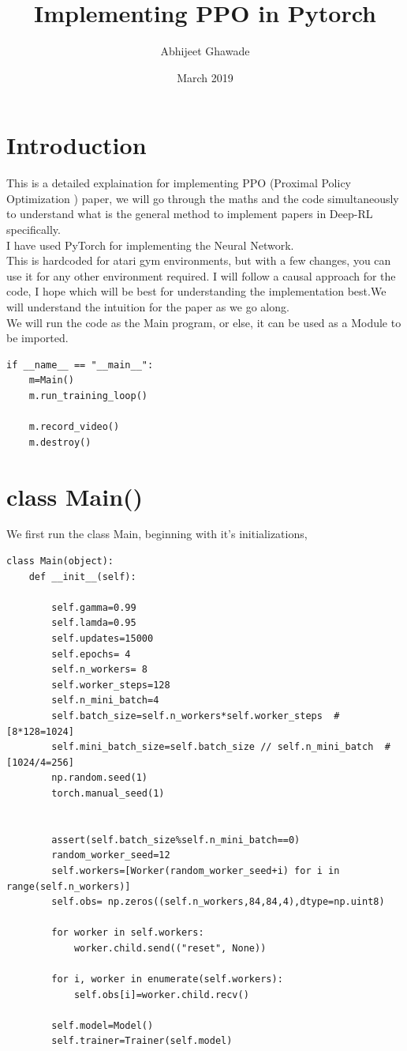 \documentclass[12pt]{extarticle}
\title{Implementing PPO in Pytorch}
\author{Abhijeet Ghawade}
\date{March 2019}
\begin{document}
\maketitle
\section{Introduction}
This is a detailed explaination for implementing PPO (Proximal Policy Optimization ) paper, we will go through the maths and the code simultaneously to understand what is the general method to implement papers in Deep-RL specifically. \\
I have used PyTorch for implementing the Neural Network. \\
This is hardcoded for atari gym environments, but with a few changes, you can use it for any other environment required. 
I will follow a causal approach for the code, I hope which will be best for understanding the implementation best.We will understand the intuition for the paper as we go along. \\


We will run the code as the Main program, or else, it can be used as a Module to be imported. 
\begin{lstlisting}
if __name__ == "__main__":
	m=Main()
	m.run_training_loop()
	
	m.record_video()
	m.destroy()
\end{lstlisting}

\section{class Main()}
We first run the class Main, beginning with it's initializations, 

\begin{lstlisting}
class Main(object):
	def __init__(self):

		self.gamma=0.99
		self.lamda=0.95
		self.updates=15000
		self.epochs= 4 
		self.n_workers= 8
		self.worker_steps=128
		self.n_mini_batch=4
		self.batch_size=self.n_workers*self.worker_steps  #[8*128=1024]
		self.mini_batch_size=self.batch_size // self.n_mini_batch  #[1024/4=256]
		np.random.seed(1)
		torch.manual_seed(1)


		assert(self.batch_size%self.n_mini_batch==0)
		random_worker_seed=12
		self.workers=[Worker(random_worker_seed+i) for i in range(self.n_workers)]
		self.obs= np.zeros((self.n_workers,84,84,4),dtype=np.uint8)

		for worker in self.workers:
			worker.child.send(("reset", None))

		for i, worker in enumerate(self.workers):
			self.obs[i]=worker.child.recv()

		self.model=Model()
		self.trainer=Trainer(self.model)
\end{lstlisting}
%
\end{document}
